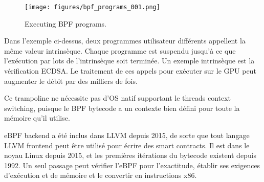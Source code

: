 \documentclass[12pt]{article}
\begin{document}
\begin{figure}
  \begin{center}
    \centering
    \texttt{[image: figures/bpf\_programs\_001.png]}
    \caption[Fig 11]{Executing  BPF programs.\label{fig_11}}
  \end{center}
  \end{figure}

Dans l'exemple ci-dessus, deux programmes utilisateur différents appellent la même valeur intrinsèque. Chaque programme est suspendu jusqu'à ce que l'exécution par lots de l'intrinsèque soit terminée. Un exemple intrinsèque est la vérification ECDSA. Le traitement de ces appels pour exécuter sur le GPU peut augmenter le débit par des milliers de fois.

Ce trampoline ne nécessite pas d’OS natif supportant le threads context switching, puisque le BPF bytecode a un contexte bien défini pour toute la mémoire qu'il utilise.

eBPF backend a été inclus dans LLVM depuis 2015, de sorte que tout langage LLVM frontend peut être utilisé pour écrire des smart contracts. Il est dans le noyau Linux depuis 2015, et les premières itérations du bytecode existent depuis 1992. Un seul passage peut vérifier l'eBPF pour l'exactitude, établir ses exigences d'exécution et de mémoire et le convertir en instructions x86.



\end{document}
